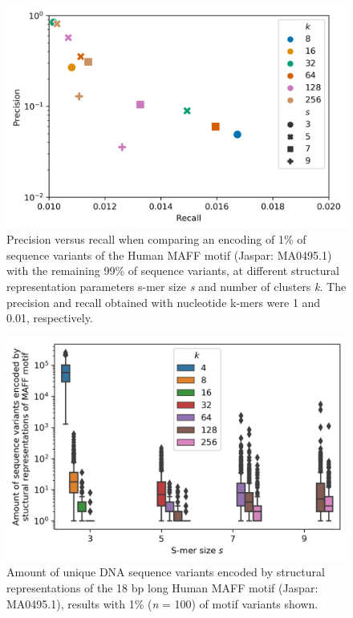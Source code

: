 \documentclass[sigconf]{acmart}
\begin{document}
\begin{figure}[ht]
  \centering
  \includegraphics[width=\linewidth]{smer_fig_prc.png}
  \caption{Precision versus recall when comparing an encoding of 1\% of sequence variants of the Human MAFF motif (Jaspar: MA0495.1) with the remaining 99\% of sequence variants, at different structural representation parameters s-mer size \textit{s} and number of clusters \textit{k}. The precision and recall obtained with nucleotide k-mers were 1 and 0.01, respectively.}
\end{figure}

\begin{figure}[ht]
  \centering
  \includegraphics[width=\linewidth]{smer_fig_variants.png}
  \caption{Amount of unique DNA sequence variants encoded by structural representations of the 18 bp long Human MAFF motif (Jaspar: MA0495.1), results with 1\% (\textit{n} = 100) of motif variants shown.}
\end{figure}
\end{document}
